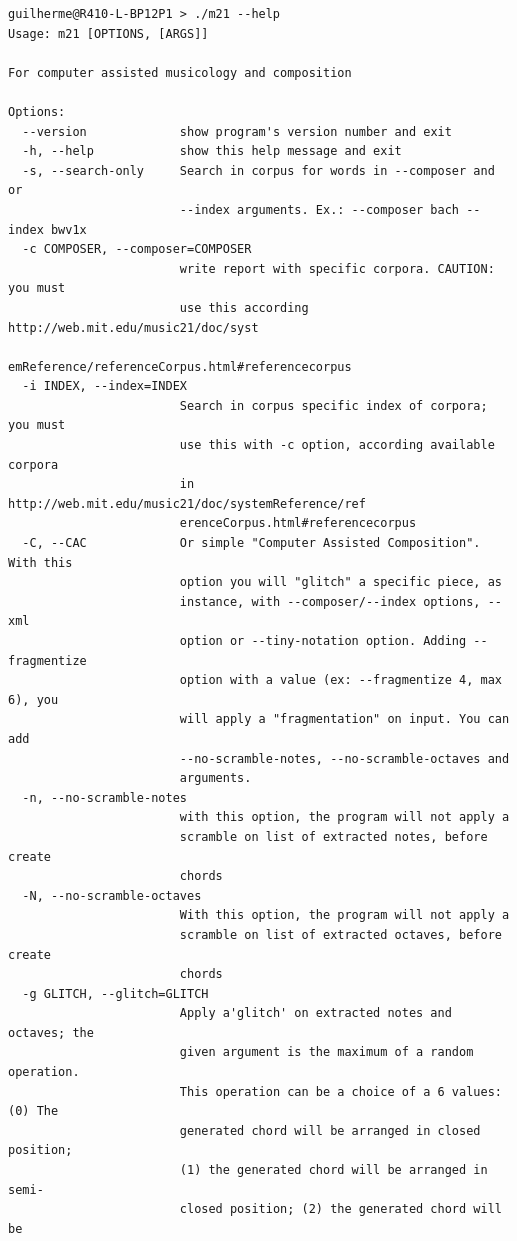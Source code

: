 \begin{verbatim}
guilherme@R410-L-BP12P1 > ./m21 --help
Usage: m21 [OPTIONS, [ARGS]]

For computer assisted musicology and composition

Options:
  --version             show program's version number and exit
  -h, --help            show this help message and exit
  -s, --search-only     Search in corpus for words in --composer and or
                        --index arguments. Ex.: --composer bach --index bwv1x
  -c COMPOSER, --composer=COMPOSER
                        write report with specific corpora. CAUTION: you must
                        use this according http://web.mit.edu/music21/doc/syst
                        emReference/referenceCorpus.html#referencecorpus
  -i INDEX, --index=INDEX
                        Search in corpus specific index of corpora; you must
                        use this with -c option, according available corpora
                        in  http://web.mit.edu/music21/doc/systemReference/ref
                        erenceCorpus.html#referencecorpus
  -C, --CAC             Or simple "Computer Assisted Composition". With this
                        option you will "glitch" a specific piece, as
                        instance, with --composer/--index options, --xml
                        option or --tiny-notation option. Adding --fragmentize
                        option with a value (ex: --fragmentize 4, max 6), you
                        will apply a "fragmentation" on input. You can add
                        --no-scramble-notes, --no-scramble-octaves and
                        arguments.
  -n, --no-scramble-notes
                        with this option, the program will not apply a
                        scramble on list of extracted notes, before create
                        chords
  -N, --no-scramble-octaves
                        With this option, the program will not apply a
                        scramble on list of extracted octaves, before create
                        chords
  -g GLITCH, --glitch=GLITCH
                        Apply a'glitch' on extracted notes and octaves; the
                        given argument is the maximum of a random operation.
                        This operation can be a choice of a 6 values: (0) The
                        generated chord will be arranged in closed position;
                        (1) the generated chord will be arranged in semi-
                        closed position; (2) the generated chord will be

\end{verbatim}
